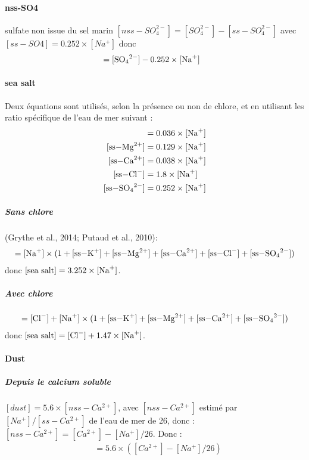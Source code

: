 \paragraph{nss-SO4} \autocite{seinfieldAtmospheric1998} sulfate non issue du sel marin
$[nss-SO_4^{2-}] = [SO_4^{2-}] - [ss-SO_4^{2-}]$ avec $[ss-SO4] = 0.252\times[Na^+]$ donc 
\begin{align*}
    [\ce{nss-SO_4^{2-}}] &= [\ce{SO_4^{2-}}] - 0.252\times[\ce{Na+}]
\end{align*}

\paragraph{sea salt} Deux équations sont utilisés, selon la présence ou non de chlore, et
en utilisant les ratio spécifique de l'eau de mer suivant :
\begin{align*}
    [\ce{ss-K+}]        &= 0.036\times[\ce{Na+}]\\
    [\ce{ss-Mg^{2+}}]   &= 0.129\times[\ce{Na+}]\\
    [\ce{ss-Ca^{2+}}]   &= 0.038\times[\ce{Na+}]\\
    [\ce{ss-Cl^-}]      &= 1.8\times[\ce{Na+}]\\
    [\ce{ss-SO_4^{2-}}] &= 0.252\times[\ce{Na+}]
\end{align*}

\subparagraph{Sans chlore} \autocite{putaudEuropean2010} (Grythe et al., 2014; Putaud et al., 2010):
\begin{align*}
    [\text{sea salt}] = [\ce{Na+}]\times(1 + [\ce{ss-K+}] + [\ce{ss-Mg^{2+}}] + [\ce{ss-Ca^{2+}}] + [\ce{ss-Cl-}] + [\ce{ss-SO_4^{2-}}])
\end{align*}
donc $[\text{sea salt}] = 3.252\times[\ce{Na+}]$.

\subparagraph{Avec chlore} \autocite{putaudEuropean2010}
\begin{align*}
    [sea~salt] = [\ce{Cl-}] + [\ce{Na+}]\times(1 + [\ce{ss-K+}] + [\ce{ss-Mg^{2+}}] + [\ce{ss-Ca^{2+}}] + [\ce{ss-SO_4^{2-}}])
\end{align*}
donc $[\text{sea salt}] = [\ce{Cl-}] + 1.47\times[\ce{Na+}]$.

\paragraph{Dust}
\subparagraph{Depuis le calcium soluble} \autocite{putaudEuropean2004}
$[dust] = 5.6 \times [nss-Ca^{2+}]$, avec $[nss-Ca^{2+}]$ estimé par $[Na^+]/[ss-Ca^{2+}]$
de l'eau de mer de 26, donc : $[nss-Ca^{2+}] = [Ca^{2+}] - [Na^+]/26$. Donc :
\begin{align*}
    [dust] &= 5.6 \times ([Ca^{2+}] - [Na^+]/26)
\end{align*}

